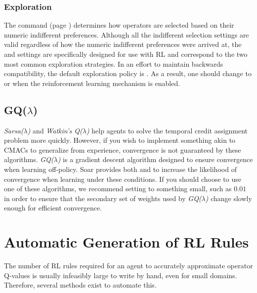 \subsubsection{Exploration}

The  command (page \pageref{decide-indifferent-selection}) determines how operators are selected based on their numeric indifferent preferences.
Although all the indifferent selection settings are valid regardless of how the numeric indifferent preferences were arrived at, the  and  settings are specifically designed for use with RL and correspond to the two most common exploration strategies.
In an effort to maintain backwards compatibility, the default exploration policy is .
As a result, one should change to  or  when the reinforcement learning mechanism is enabled.

\subsection{\texorpdfstring{GQ($\lambda$)}{GQ(lambda)}}

\emph{Sarsa($\lambda$)} and \emph{Watkin's Q($\lambda$)} help agents to solve the temporal credit assignment problem more quickly.
However, if you wish to implement something akin to CMACs to generalize from experience, convergence is not guaranteed by these algorithms.
\emph{GQ($\lambda$)} is a gradient descent algorithm designed to ensure convergence when learning off-policy.
Soar provides both  and  to increase the likelihood of convergence when learning under these conditions.
If you should choose to use one of these algorithms, we recommend setting  to something small, such as $0.01$
in order to ensure that the secondary set of weights used by \emph{GQ($\lambda$)} change slowly enough for efficient convergence.

\section{Automatic Generation of RL Rules}

The number of RL rules required for an agent to accurately approximate operator Q-values is usually infeasibly large to write by hand, even for small domains.
Therefore, several methods exist to automate this.

